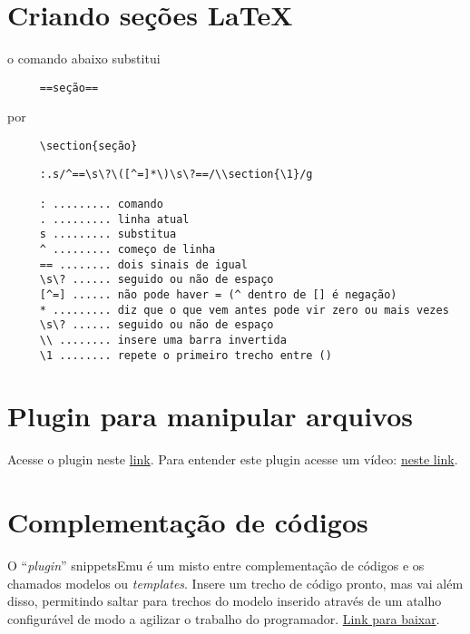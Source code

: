 \section{Criando seções \LaTeX}\label{Criando seções latex}
o comando abaixo substitui

\begin{verbatim}
     ==seção==
\end{verbatim}

   por

\begin{verbatim}
     \section{seção}
\end{verbatim}

\begin{verbatim}
     :.s/^==\s\?\([^=]*\)\s\?==/\\section{\1}/g
     
     : ......... comando
     . ......... linha atual
     s ......... substitua
     ^ ......... começo de linha
     == ........ dois sinais de igual
     \s\? ...... seguido ou não de espaço
     [^=] ...... não pode haver = (^ dentro de [] é negação)
     * ......... diz que o que vem antes pode vir zero ou mais vezes
     \s\? ...... seguido ou não de espaço
     \\ ........ insere uma barra invertida
     \1 ........ repete o primeiro trecho entre ()
\end{verbatim}

\section{Plugin para manipular arquivos}
Acesse o plugin neste
\href{http://www.vim.org/scripts/script.php?script\_id=2337#0.1.9}{link}.
Para entender este plugin acesse um vídeo:
 \href{http://www.screencast.com/t/P6nJkJ0DE}{neste link}.


\section{Complementação de códigos}
\label{Complementação de códigos}

O ``{\em plugin}'' snippetsEmu é um misto entre complementação de códigos e
os chamados modelos ou {\em templates}. Insere um trecho de código pronto,
mas vai além disso, permitindo saltar para trechos do modelo inserido
através de um atalho configurável de modo a agilizar o trabalho do
programador. \href{http://www.vim.org/scripts/script.php?script\_id=1318}{Link para baixar}.

